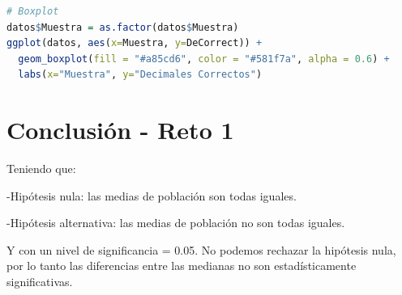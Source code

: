 \documentclass{article}
\begin{document}
\begin{lstlisting}[language=R, caption= C\'odigo data frame \texttt{datos}.]
# Boxplot
datos$Muestra = as.factor(datos$Muestra)
ggplot(datos, aes(x=Muestra, y=DeCorrect)) +
  geom_boxplot(fill = "#a85cd6", color = "#581f7a", alpha = 0.6) +
  labs(x="Muestra", y="Decimales Correctos")
\end{lstlisting}

\newpage
\section{Conclusi\'on - Reto 1}

Teniendo que:

-Hip\'otesis nula: las medias de poblaci\'on son todas iguales.

-Hip\'otesis alternativa: las medias de poblaci\'on no son todas iguales. 

Y con un nivel de significancia = 0.05. No podemos rechazar la hip\'otesis nula, por lo tanto las diferencias entre las medianas no son  estad\'isticamente significativas.




\end{document}
